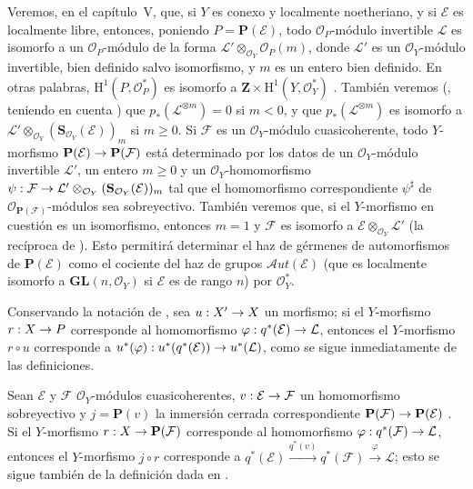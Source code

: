 \documentclass[oneside,10pt]{amsart}
\makeatletter
\renewcommand{\geq}{\geqslant}
\newcommand{\ega@arrow}[2]{\mathchoice{#1}{#2}{#2}{#2}}
\renewcommand{\to}{\ega@arrow{\longrightarrow}{\rightarrow}}
\newcommand{\oldpage}[2][]{\marginnote{\normalfont\footnotesize\textbf{#1}~|~#2}\ignorespaces}
\let\EGAOriginalLabel\label
\renewcommand{\label}[1]{\phantomsection\EGAOriginalLabel{#1}}
\makeatother
\begin{document}
\begin{remark}[4.2.7]
\label{II.4.2.7-fr}
Veremos, en el capítulo~V, que, si $Y$ es conexo y localmente noetheriano, y si $\mathcal{E}$ es localmente libre, entonces, poniendo $P=\mathbf{P}(\mathcal{E})$, todo $\mathcal{O}_P$-módulo invertible $\mathcal{L}$ es isomorfo a un $\mathcal{O}_P$-módulo de la forma $\mathcal{L}'\otimes_{\mathcal{O}_Y}\mathcal{O}_P(m)$, donde $\mathcal{L}'$ es un $\mathcal{O}_Y$-módulo invertible, bien definido salvo isomorfismo, y $m$ es un entero bien definido.
En otras palabras, $\mathrm{H}^1(P,\mathcal{O}_P^*)$ es isomorfo a $\mathbf{Z}\times\mathrm{H}^1(Y,\mathcal{O}_Y^*)$ .
También veremos (, teniendo en cuenta ) que $p_*(\mathcal{L}^{\otimes m})=0$ si $m<0$, y que $p_*(\mathcal{L}^{\otimes m})$ es isomorfo a $\mathcal{L}'\otimes_{\mathcal{O}_Y}
(\mathbf{S}_{\mathcal{O}_Y}(\mathcal{E}))_m$ si $m\geq0$.
Si $\mathcal{F}$ es un $\mathcal{O}_Y$-módulo cuasicoherente, todo $Y$-morfismo $\mathbf{P}(\mathcal{E})\to\mathbf{P}(\mathcal{F})$ está determinado por los datos de un $\mathcal{O}_Y$-módulo invertible $\mathcal{L}'$, un entero $m\geq0$ y un $\mathcal{O}_Y$-homomorfismo $\psi:\mathcal{F}\to\mathcal{L}'\otimes_{\mathcal{O}_Y}
(\mathbf{S}_{\mathcal{O}_Y}(\mathcal{E}))_m$ tal que el homomorfismo correspondiente $\psi^\sharp$ de $\mathcal{O}_{\mathbf{P}(\mathcal{F})}$-módulos sea sobreyectivo.
También veremos que, si el $Y$-morfismo en cuestión es un isomorfismo, entonces $m=1$ y $\mathcal{F}$ es isomorfo a $\mathcal{E}\otimes_{\mathcal{O}_Y}\mathcal{L}'$ (la recíproca de ).
Esto permitirá determinar el haz de gérmenes de automorfismos de $\mathbf{P}(\mathcal{E})$ como el cociente del haz de grupos $\mathcal{A}ut(\mathcal{E})$ (que es localmente isomorfo a $\mathbf{GL}(n,\mathcal{O}_Y)$ si $\mathcal{E}$ es de rango $n$) por $\mathcal{O}_Y^*$.
\end{remark}

\begin{env}[4.2.8]
\label{II.4.2.8-fr}
Conservando la notación de , sea $u:X'\to X$ un morfismo;
si el $Y$-morfismo $r:X\to P$ corresponde al homomorfismo $\varphi:q^*(\mathcal{E})\to\mathcal{L}$, entonces el $Y$-morfismo $r\circ u$ corresponde a $u^*(\varphi):u^*(q^*(\mathcal{E}))\to u^*(\mathcal{L})$, como se sigue inmediatamente de las definiciones.
\end{env}

\begin{env}[4.2.9]
\label{II.4.2.9-fr}
Sean $\mathcal{E}$ y $\mathcal{F}$ $\mathcal{O}_Y$-módulos cuasicoherentes, $v:\mathcal{E}\to\mathcal{F}$ un homomorfismo sobreyectivo y $j=\mathbf{P}(v)$ la inmersión cerrada correspondiente $\mathbf{P}(\mathcal{F})\to\mathbf{P}(\mathcal{E})$ .
Si el $Y$-morfismo $r:X\to\mathbf{P}(\mathcal{F})$ corresponde al homomorfismo $\varphi:q^*(\mathcal{F})\to\mathcal{L}$, entonces el
\oldpage[II]{76}
$Y$-morfismo $j\circ r$ corresponde a $q^*(\mathcal{E})\xrightarrow{q^*(v)}q^*(\mathcal{F})
\xrightarrow{\varphi}\mathcal{L}$;
esto se sigue también de la definición dada en .
\end{env}
\end{document}
